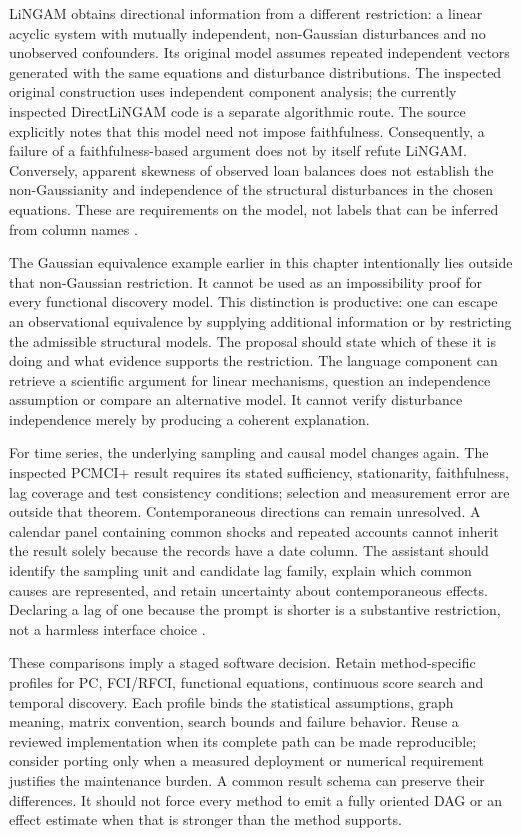 LiNGAM obtains directional information from a different restriction: a linear
acyclic system with mutually independent, non-Gaussian disturbances and no
unobserved confounders. Its original model assumes repeated independent
vectors generated with the same equations and disturbance distributions.
The inspected original construction uses independent component analysis;
the currently inspected DirectLiNGAM code is a separate algorithmic route.
The source explicitly notes that this model need not impose faithfulness.
Consequently, a failure of a faithfulness-based argument does not by itself
refute LiNGAM. Conversely, apparent skewness of observed loan balances does
not establish the non-Gaussianity and independence of the structural
disturbances in the chosen equations. These are requirements on the model,
not labels that can be inferred from column names
\citep{exec13_pydisc_shimizu2006,exec13_pydisc_lingam}.

The Gaussian equivalence example earlier in this chapter intentionally lies
outside that non-Gaussian restriction. It cannot be used as an impossibility
proof for every functional discovery model. This distinction is productive:
one can escape an observational equivalence by supplying additional
information or by restricting the admissible structural models. The proposal
should state which of these it is doing and what evidence supports the
restriction. The language component can retrieve a scientific argument for
linear mechanisms, question an independence assumption or compare an
alternative model. It cannot verify disturbance independence merely by
producing a coherent explanation.

For time series, the underlying sampling and causal model changes again.
The inspected PCMCI+ result requires its stated sufficiency, stationarity,
faithfulness, lag coverage and test consistency conditions; selection and
measurement error are outside that theorem. Contemporaneous directions can
remain unresolved. A calendar panel containing common shocks and repeated
accounts cannot inherit the result solely because the records have a date
column. The assistant should identify the sampling unit and candidate lag
family, explain which common causes are represented, and retain uncertainty
about contemporaneous effects. Declaring a lag of one because the prompt is
shorter is a substantive restriction, not a harmless interface choice
\citep{runge2020}.

These comparisons imply a staged software decision. Retain method-specific
profiles for PC, FCI/RFCI, functional equations, continuous score search and
temporal discovery. Each profile binds the statistical assumptions, graph
meaning, matrix convention, search bounds and failure behavior. Reuse a
reviewed implementation when its complete path can be made reproducible;
consider porting only when a measured deployment or numerical requirement
justifies the maintenance burden. A common result schema can preserve their
differences. It should not force every method to emit a fully oriented DAG or
an effect estimate when that is stronger than the method supports.

